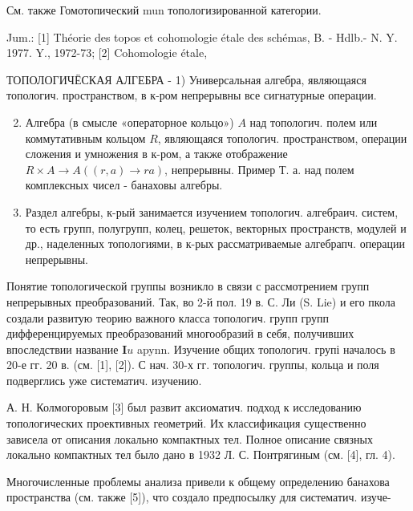 \documentclass[10pt]{article}
\begin{document}
См. также Гомотопический mun топологизированной категории.



Jum.: [1] Théorie des topos et cohomologie étale des schémas, B. - Hdlb.- N. Y. 1977. Y., 1972-73; [2] Cohomologie étale,



ТОПОЛОГИЧЁСКАЯ АЛГЕБРА - 1) Универсальная алгебра, являющаяся топологич. пространством, в к-ром непрерывны все сигнатурные операции.



\begin{enumerate}

  \setcounter{enumi}{1}

  \item Алгебра (в смысле «операторное кольцо») $A$ над топологич. полем или коммутативным кольцом $R$, являющаяся топологич. пространством, операции сложения и умножения в к-ром, а также отображение $R \times A \rightarrow A((r, a) \rightarrow r a)$, непрерывны. Пример Т. а. над полем комплексных чисел - банаховы алгебры.



  \item Раздел алгебры, к-рый занимается изучением топологич. алгебраич. систем, то есть групп, полугрупп, колец, решеток, векторных пространств, модулей и др., наделенных топологиями, в к-рых рассматриваемые алгебрапч. операции непрерывны.



\end{enumerate}



Понятие топологической группы возникло в связи с рассмотрением групп непрерывных преобразований. Так, во 2-й пол. 19 в. С. Ли (S. Lie) и его пкола создали развитую теорию важного класса топологич. групп групп дифференцируемых преобразований многообразий в себя, получивших впоследствии название $\boldsymbol{I} u$ apynn. Изучение общих топологич. групі началось в 20-е гг. 20 в. (см. [1], [2]). С нач. 30-х гг. топологич. группы, кольца и поля подверглись уже систематич. изучению.



А. Н. Колмогоровым [3] был развит аксиоматич. подход к исследованию топологических проективных геометрий. Их классификация существенно зависела от описания локально компактных тел. Полное описание связных локально компактных тел было дано в 1932 Л. С. Понтрягиным (см. [4], гл. 4).



Многочисленные проблемы анализа привели к общему определению банахова пространства (см. также [5]), что создало предпосылку для систематич. изуче-
\end{document}
